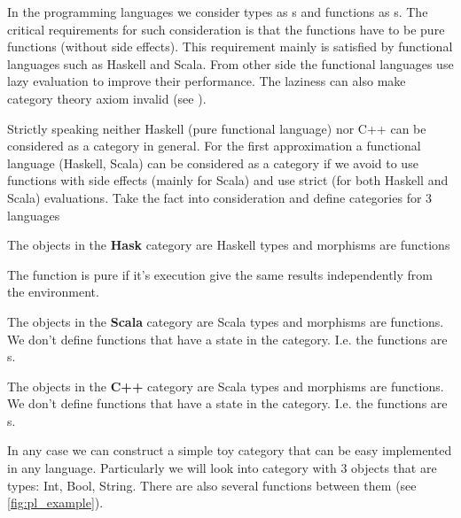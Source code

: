In the programming languages we consider types as
s and functions as
s. The critical requirements for such
consideration is that the functions have to be pure functions (without
side effects). This requirement mainly is satisfied by functional
languages such as Haskell and Scala. From other side the functional
languages use lazy evaluation to improve their performance. The laziness
can also make category theory axiom invalid (see
). 

Strictly speaking neither Haskell (pure functional language) nor C++
can be considered as a category in general. For the first approximation
a functional language (Haskell, Scala) can be considered as a
category if we avoid to use functions with side effects (mainly for
Scala) and use strict (for both Haskell and Scala) evaluations. Take
the fact into consideration and define categories for 3 languages

\begin{definition}
\label{def:haskcategory}
The objects in the \textbf{Hask} category are Haskell types and
morphisms are functions
\end{definition}

\begin{definition}
\label{def:pure_function}
The function is pure if it's execution give the same results
independently from the environment. 
\end{definition}

\begin{definition}
\label{def:scalacategory}
The objects in the \textbf{Scala} category are Scala types and
morphisms are functions. We don't define functions that have a state
in the category. I.e. the functions are s. 
\end{definition}

\begin{definition}
\label{def:cppcategory}
The objects in the \textbf{C++} category are Scala types and
morphisms are functions. We don't define functions that have a state
in the category. I.e. the functions are s. 
\end{definition}


In any case we can construct a simple toy category that can be easy
implemented in any language. Particularly we will look into category
with 3 objects that are types: Int, Bool, String. There are also
several functions between them (see \cref{fig:pl_example}).   

